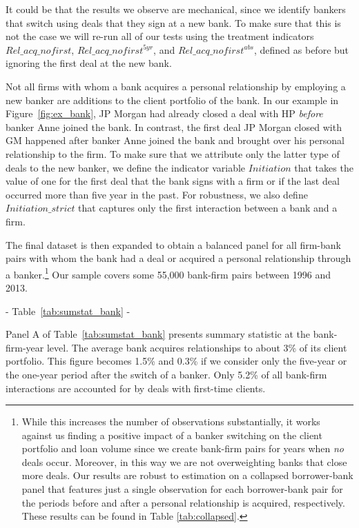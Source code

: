 It could be that the results we observe are mechanical, since we identify bankers that switch using deals that they sign at a new bank. To make sure that this is not the case we will re-run all of our tests using the treatment indicators $Rel\_acq\_nofirst$, $Rel\_acq\_nofirst^{5yr}$, and $Rel\_acq\_nofirst^{abs}$, defined as before but ignoring the first deal at the new bank.

Not all firms with whom a bank acquires a personal relationship by employing a new banker are additions to the client portfolio of the bank. In our example in Figure~\ref{fig:ex_bank}, JP Morgan had already closed a deal with HP \emph{before} banker Anne joined the bank. In contrast, the first deal JP Morgan closed with GM happened after banker Anne joined the bank and brought over his personal relationship to the firm. To make sure that we attribute only the latter type of deals to the new banker, we define the indicator variable $Initiation$ that takes the value of one for the first deal that the bank signs with a firm or if the last deal occurred more than five year in the past. For robustness, we also define $Initiation\_strict$ that captures only the first interaction between a bank and a firm. %

The final dataset is then expanded to obtain a balanced panel for all firm-bank pairs with whom the bank had a deal or acquired a personal relationship through a banker.\footnote{While this increases the number of observations substantially, it works against us finding a positive impact of a banker switching on the client portfolio and loan volume since we create bank-firm pairs for years when \emph{no} deals occur. Moreover, in this way we are not overweighting banks that close more deals. Our results are robust to estimation on a collapsed borrower-bank panel that features just a single observation for each borrower-bank pair for the periods before and after a personal relationship is acquired, respectively. These results can be found in Table \ref{tab:collapsed}.} Our sample covers some 55,000 bank-firm pairs between 1996 and 2013. 

\begin{center} - Table~\ref{tab:sumstat_bank} - \end{center}

Panel A of Table~\ref{tab:sumstat_bank} presents summary statistic at the bank-firm-year level. The average bank acquires relationships to about 3\% of its client portfolio. This figure becomes 1.5\% and 0.3\% if we consider only the five-year or the one-year period after the switch of a banker. Only 5.2\% of all bank-firm interactions are accounted for by deals with first-time clients. 

